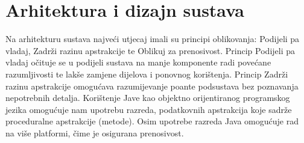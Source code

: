 \chapter{Arhitektura i dizajn sustava}
		
		Na arhitekturu sustava najveći utjecaj imali su principi oblikovanja: Podijeli pa vladaj, Zadrži razinu apstrakcije te Oblikuj za prenosivost. Princip Podijeli pa vladaj očituje se u podijeli sustava na manje komponente radi povećane razumljivosti te lakše zamjene dijelova i ponovnog korištenja. Princip Zadrži razinu apstrakcije omogućava razumijevanje poante podsustava bez poznavanja nepotrebnih detalja. Korištenje Jave kao objektno orijentiranog programskog jezika omogućuje nam upotrebu razreda, podatkovnih apstrakcija koje sadrže proceduralne apstrakcije (metode). Osim upotrebe razreda Java omogućuje rad na više platformi, čime je osigurana prenosivost.
		
